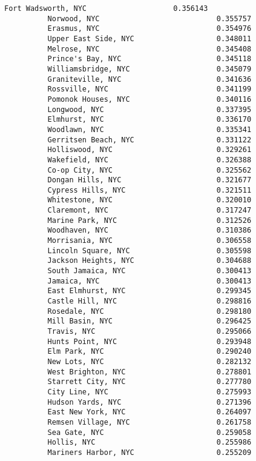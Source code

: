 \documentclass[11pt]{article}
\begin{document}
\begin{Verbatim}[commandchars=\\\{\}]
          Fort Wadsworth, NYC                    0.356143
          Norwood, NYC                           0.355757
          Erasmus, NYC                           0.354976
          Upper East Side, NYC                   0.348011
          Melrose, NYC                           0.345408
          Prince's Bay, NYC                      0.345118
          Williamsbridge, NYC                    0.345079
          Graniteville, NYC                      0.341636
          Rossville, NYC                         0.341199
          Pomonok Houses, NYC                    0.340116
          Longwood, NYC                          0.337395
          Elmhurst, NYC                          0.336170
          Woodlawn, NYC                          0.335341
          Gerritsen Beach, NYC                   0.331122
          Holliswood, NYC                        0.329261
          Wakefield, NYC                         0.326388
          Co-op City, NYC                        0.325562
          Dongan Hills, NYC                      0.321677
          Cypress Hills, NYC                     0.321511
          Whitestone, NYC                        0.320010
          Claremont, NYC                         0.317247
          Marine Park, NYC                       0.312526
          Woodhaven, NYC                         0.310386
          Morrisania, NYC                        0.306558
          Lincoln Square, NYC                    0.305598
          Jackson Heights, NYC                   0.304688
          South Jamaica, NYC                     0.300413
          Jamaica, NYC                           0.300413
          East Elmhurst, NYC                     0.299345
          Castle Hill, NYC                       0.298816
          Rosedale, NYC                          0.298180
          Mill Basin, NYC                        0.296425
          Travis, NYC                            0.295066
          Hunts Point, NYC                       0.293948
          Elm Park, NYC                          0.290240
          New Lots, NYC                          0.282132
          West Brighton, NYC                     0.278801
          Starrett City, NYC                     0.277780
          City Line, NYC                         0.275993
          Hudson Yards, NYC                      0.271396
          East New York, NYC                     0.264097
          Remsen Village, NYC                    0.261758
          Sea Gate, NYC                          0.259058
          Hollis, NYC                            0.255986
          Mariners Harbor, NYC                   0.255209

\end{Verbatim}
\end{document}
